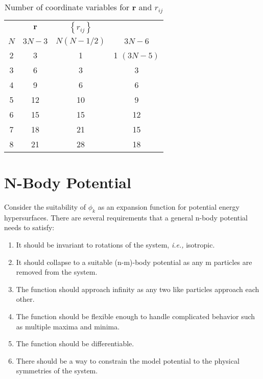 \documentclass[12pt,thmsa]{article}
\begin{document}
\begin{table}[tbp] \centering%
\begin{tabular}{cccc}
\hline\hline
& $\mathbf{r}$ & $\left\{ r_{ij}\right\} $ &  \\ 
$N$ & $3N-3$ & $N\left( N-1/2\right) $ & $3N-6$ \\ \hline
2 & 3 & 1 & 1$\,\,(3N-5)$ \\ 
3 & 6 & 3 & 3 \\ 
4 & 9 & 6 & 6 \\ 
5 & 12 & 10 & 9 \\ 
6 & 15 & 15 & 12 \\ 
7 & 18 & 21 & 15 \\ 
8 & 21 & 28 & 18 \\ \hline
\end{tabular}
\caption{Number of coordinate variables for {\bf{r}} and $ r_{ij} $
\label{Ntab}}%
\end{table}%

\section{N-Body Potential}

Consider the suitability of $\phi _k$ as an expansion function for potential
energy hypersurfaces. There are several requirements that a general n-body
potential needs to satisfy:

\begin{enumerate}
\item  It should be invariant to rotations of the system, \textit{i.e.,}
isotropic.

\item  It should collapse to a suitable (n-m)-body potential as any m
particles are removed from the system.

\item  The function should approach infinity as any two like particles
approach each other.

\item  The function should be flexible enough to handle complicated behavior
such as multiple maxima and minima.

\item  The function should be differentiable.

\item  There should be a way to constrain the model potential to the
physical symmetries of the system.
\end{enumerate}
\end{document}
